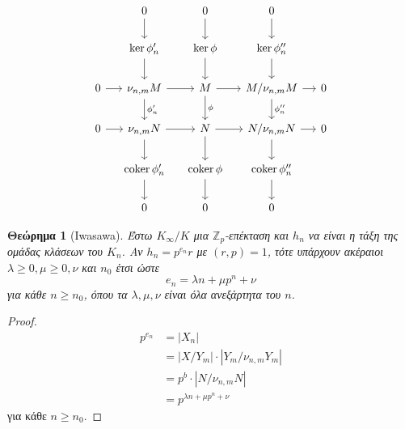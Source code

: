 \documentclass{beamer}
\newcommand {\tl}{\textlatin}
\newcommand{\Z}{\mathbb{Z}}
\newtheorem{thrm}{Θεώρημα}
\begin{document}
\begin{frame}
\[
\centering
\begin{tikzcd}[ampersand replacement=\&, column sep=small]
            \& 0 \arrow[d]                                        \& 0 \arrow[d]                        \& 0 \arrow[d]                                                 \&   \\
            \& \ker \phi^\prime_n \arrow[d]                       \& \ker\phi \arrow[d]                \& \ker \phi^{\prime\prime}_n \arrow[d]                        \&   \\
0 \arrow[r] \& {\nu_{n,m} M} \arrow[d, "\phi^\prime_n"] \arrow[r] \& M \arrow[r] \arrow[d, "\phi"]      \& {M/\nu_{n,m}M} \arrow[r] \arrow[d, "\phi^{\prime\prime}_n"] \& 0 \\
0 \arrow[r] \& {\nu_{n,m}N} \arrow[d] \arrow[r]                   \& N \arrow[r] \arrow[d]              \& {N/\nu_{n,m}N} \arrow[r] \arrow[d]                          \& 0 \\
            \& \operatorname{coker}\phi^\prime_n \arrow[d]       \& \operatorname{coker}\phi \arrow[d] \& \operatorname{coker}\phi^{\prime\prime}_n \arrow[d]         \&   \\
            \& 0                                                  \& 0                                  \& 0                                                           \&  
\end{tikzcd}
\]

\end{frame}

\begin{frame}
\begin{thrm}[\tl{Iwasawa}]
	Έστω $K_\infty/K$ μια $\Z_p$-επέκταση και $h_n$ να είναι η τάξη της ομάδας κλάσεων του $K_n$. Αν $h_n = p^{e_n}r$ με  $(r,p)=1$, τότε υπάρχουν 
	ακέραιοι $\lambda \geq 0, \mu \geq 0, \nu$ και $n_0$ έτσι ώστε
	$$e_n = \lambda n + \mu p^n + \nu$$ για κάθε $n\geq n_0$, όπου τα $\lambda,\mu,\nu$ είναι όλα ανεξάρτητα του $n$. 
\end{thrm}

\begin{proof}
\begin{align*}
    p^{e_n} &= |X_n| \\
    &= |X/Y_m|\cdot |Y_m/\nu_{n,m}Y_m| \\
    &=p^b \cdot |N/\nu_{n,m}N| \\ 
    &= p^{\lambda n + \mu p^n + \nu}
\end{align*} για κάθε $n\geq n_0$. 
\end{proof}
\end{frame}
\end{document}

